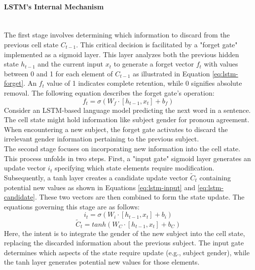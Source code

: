 \paragraph{LSTM's Internal Mechanism}\mbox{}\\
The first stage involves determining which information to discard from the previous cell state $C_{t-1}$. This critical decision is facilitated by a "forget gate" implemented as a sigmoid layer. This layer analyzes both the previous hidden state $h_{t-1}$ and the current input $x_t$ to generate a forget vector $f_t$ with values between 0 and 1 for each element of $C_{t-1}$ as illustrated in Equation \ref{eq:lstm-forget}. An $f_t$ value of 1 indicates complete retention, while 0 signifies absolute removal.
The following equation describes the forget gate's operation:
\begin{equation} \label{eq:lstm-forget}
    f_t = \sigma(W_f \cdot [h_{t-1}, x_t] + b_f)
\end{equation}
Consider an LSTM-based language model predicting the next word in a sentence. The cell state might hold information like subject gender for pronoun agreement. When encountering a new subject, the forget gate activates to discard the irrelevant gender information pertaining to the previous subject.\\
The second stage focuses on incorporating new information into the cell state. This process unfolds in two steps. First, a "input gate" sigmoid layer generates an update vector $i_t$ specifying which state elements require modification. Subsequently, a tanh layer creates a candidate update vector $\tilde{C}_t$ containing potential new values as shown in Equations \ref{eq:lstm-input} and \ref{eq:lstm-candidate}. These two vectors are then combined to form the state update.
The equations governing this stage are as follows:
\begin{equation} \label{eq:lstm-input}
    i_t = \sigma(W_i \cdot [h_{t-1}, x_t] + b_i)
\end{equation}
\begin{equation} \label{eq:lstm-candidate}
    \tilde{C}_t = tanh(W_C \cdot [h_{t-1}, x_t] + b_C)
\end{equation}
Here, the intent is to integrate the gender of the new subject into the cell state, replacing the discarded information about the previous subject. The input gate determines which aspects of the state require update (e.g., subject gender), while the tanh layer generates potential new values for those elements.\\
